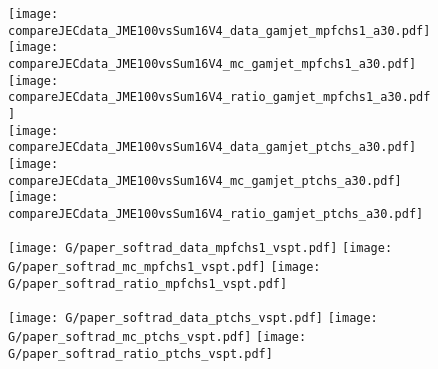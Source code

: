 \documentclass[landscape,10pt]{beamer} %
\newcommand{\commentout}[1]{}
\begin{document}
\newpage
\commentout{
\begin{figure}[p]
\centering
  \texttt{[image: L4/paper\_softrad\_data\_mpfchs1\_vspt.pdf]}
  \texttt{[image: L4/paper\_softrad\_mc\_mpfchs1\_vspt.pdf]}
  \texttt{[image: L4/paper\_softrad\_ratio\_mpfchs1\_vspt.pdf]}
\end{figure}

\begin{figure}[p]
\centering
  \texttt{[image: L4/paper\_softrad\_data\_ptchs\_vspt.pdf]}
  \texttt{[image: L4/paper\_softrad\_mc\_ptchs\_vspt.pdf]}
  \texttt{[image: L4/paper\_softrad\_ratio\_ptchs\_vspt.pdf]}
\end{figure}
} %

\newpage

\begin{figure}[p]
\centering
  \texttt{[image: compareJECdata\_JME100vsSum16V4\_data\_gamjet\_mpfchs1\_a30.pdf]}
  \texttt{[image: compareJECdata\_JME100vsSum16V4\_mc\_gamjet\_mpfchs1\_a30.pdf]}
  \texttt{[image: compareJECdata\_JME100vsSum16V4\_ratio\_gamjet\_mpfchs1\_a30.pdf]}
\\
\centering
  \texttt{[image: compareJECdata\_JME100vsSum16V4\_data\_gamjet\_ptchs\_a30.pdf]}
  \texttt{[image: compareJECdata\_JME100vsSum16V4\_mc\_gamjet\_ptchs\_a30.pdf]}
  \texttt{[image: compareJECdata\_JME100vsSum16V4\_ratio\_gamjet\_ptchs\_a30.pdf]}
\end{figure}

\newpage

\begin{figure}[p]
\centering
  \texttt{[image: G/paper\_softrad\_data\_mpfchs1\_vspt.pdf]}
  \texttt{[image: G/paper\_softrad\_mc\_mpfchs1\_vspt.pdf]}
  \texttt{[image: G/paper\_softrad\_ratio\_mpfchs1\_vspt.pdf]}
\end{figure}

\begin{figure}[p]
\centering
  \texttt{[image: G/paper\_softrad\_data\_ptchs\_vspt.pdf]}
  \texttt{[image: G/paper\_softrad\_mc\_ptchs\_vspt.pdf]}
  \texttt{[image: G/paper\_softrad\_ratio\_ptchs\_vspt.pdf]}
\end{figure}
\end{document}

